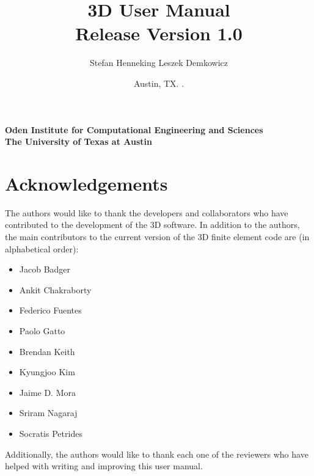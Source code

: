 \documentclass[11pt]{report}
\def\release{1.0}
\begin{document}
\baselineskip=16pt
\parskip=4pt

\begin{titlepage}

\title
{
\Huge
\hp3D User Manual\\
\large
Release Version \release
}

\author
{
\LARGE
Stefan Henneking
\hskip 40pt
Leszek Demkowicz
}

\affil
{
\large \bf
Oden Institute for Computational Engineering and Sciences\\
\large \bf
The University of Texas at Austin
}

\date
{
\large
Austin, TX. \the\year{}.
}

\maketitle

\end{titlepage}

\clearpage
{}
\setcounter{page}{2} 

\chapter*{Acknowledgements}

The authors would like to thank the developers and collaborators who have contributed to the development of the \hp3D software. In addition to the authors, the main contributors to the current version of the \hp3D finite element code are (in alphabetical order):

\begin{itemize}
	\itemsep 0pt
	\item Jacob Badger
	\item Ankit Chakraborty
	\item Federico Fuentes
	\item Paolo Gatto
	\item Brendan Keith
	\item Kyungjoo Kim
	\item Jaime D. Mora
	\item Sriram Nagaraj
	\item Socratis Petrides
\end{itemize}

Additionally, the authors would like to thank each one of the reviewers who have helped with writing and improving this user manual.
\end{document}
